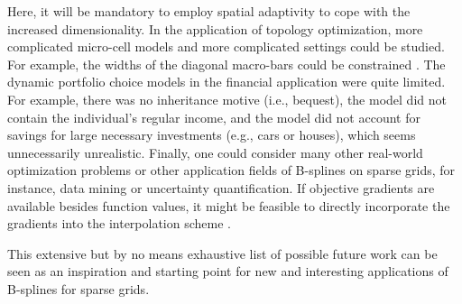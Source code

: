 Here, it will be mandatory to employ spatial adaptivity
to cope with the increased dimensionality.
In the application of topology optimization,
more complicated micro-cell models and more complicated
settings could be studied.
For example, the widths of the diagonal macro-bars could be constrained
\cite{Allaire16Towards}.
The dynamic portfolio choice models in the financial application
were quite limited.
For example,
there was no inheritance motive (i.e., bequest),
the model did not contain the individual's regular income, and
the model did not account for savings for large necessary investments
(e.g., cars or houses), which seems unnecessarily unrealistic.
Finally, one could consider many other real-world optimization problems
or other application fields of B-splines on sparse grids,
for instance, data mining or uncertainty quantification.
If objective gradients are available besides function values,
it might be feasible to directly incorporate the gradients into
the interpolation scheme \cite{Baar15Gradient}.

This extensive but by no means exhaustive list of possible future work
can be seen as an inspiration and starting point
for new and interesting applications of B-splines for sparse grids.

\cleardoublepage
